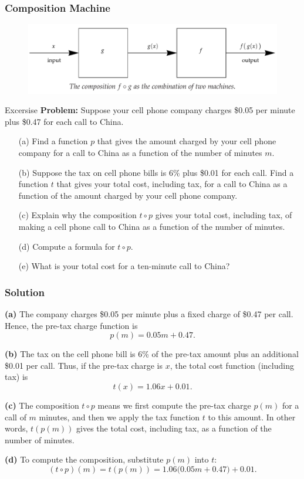 \documentclass{beamer}
\begin{document}
\begin{frame}
  \frametitle{Composition Machine}
\begin{figure}
  \centering 
  \includegraphics[scale=0.3]{composition.png}
\end{figure}
\end{frame}
\begin{frame}{Excersise}
  \textbf{Problem:} Suppose your cell phone company charges \$0.05 per minute plus \$0.47 for each call to China.
  \begin{enumerate}
    \item[(a)] Find a function \(p\) that gives the amount charged by your cell phone company for a call to China as a function of the number of minutes \(m\).
    \item[(b)] Suppose the tax on cell phone bills is 6\% plus \$0.01 for each call. Find a function \(t\) that gives your total cost, including tax, for a call to China as a function of the amount charged by your cell phone company.
    \item[(c)] Explain why the composition \(t \circ p\) gives your total cost, including tax, of making a cell phone call to China as a function of the number of minutes.
    \item[(d)] Compute a formula for \(t \circ p\).
    \item[(e)] What is your total cost for a ten-minute call to China?
  \end{enumerate}
  \end{frame} 
  \begin{frame}
    \frametitle{Solution}
    
    \textbf{(a)} The company charges \$0.05 per minute plus a fixed charge of \$0.47 per call. Hence, the pre-tax charge function is
    \[
    p(m)=0.05m+0.47.
    \]
    
    \textbf{(b)} The tax on the cell phone bill is 6\% of the pre-tax amount plus an additional \$0.01 per call. Thus, if the pre-tax charge is \(x\), the total cost function (including tax) is
    \[
    t(x)=1.06x+0.01.
    \]
    
    \textbf{(c)} The composition \(t \circ p\) means we first compute the pre-tax charge \(p(m)\) for a call of \(m\) minutes, and then we apply the tax function \(t\) to this amount. In other words, \(t(p(m))\) gives the total cost, including tax, as a function of the number of minutes.
    
    
    \textbf{(d)} To compute the composition, substitute \(p(m)\) into \(t\):
    \[
    (t \circ p)(m)=t(p(m))=1.06\bigl(0.05m+0.47\bigr)+0.01.
    \]
  \end{frame}
\end{document}
